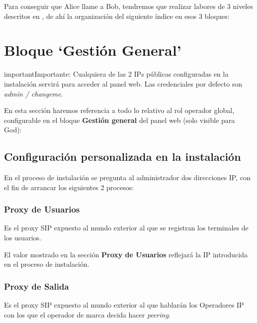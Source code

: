 \documentclass[letterpaper,10pt,spanish]{sphinxmanual}
\begin{document}
Para conseguir que Alice llame a Bob, tendremos que realizar labores de 3 niveles descritos en {\hyperref[operation_roles/index:operation\string-roles]{}}, de ahí la organización del siguiente índice en esos 3 bloques:


\section{Bloque `Gestión General'}
\label{internal_calls/god_portal::doc}\label{internal_calls/god_portal:bloque-gestion-general}
\begin{notice}{important}{Importante:}
Cualquiera de las 2 IPs públicas configuradas en la instalación servirá para acceder al panel web. Las credenciales por defecto son \emph{admin / changeme}.
\end{notice}

En esta sección haremos referencia a todo lo relativo al rol operador global, configurable en el bloque \textbf{Gestión general} del panel web (solo visible para God):



\subsection{Configuración personalizada en la instalación}
\label{internal_calls/god_portal:configuracion-personalizada-en-la-instalacion}
En el proceso de instalación se pregunta al administrador dos direcciones IP, con el fin de arrancar los siguientes 2 procesos:


\subsubsection{Proxy de Usuarios}
\label{internal_calls/god_portal:proxyusers}\label{internal_calls/god_portal:proxy-de-usuarios}
Es el proxy SIP expuesto al mundo exterior al que se registran los terminales de los usuarios.

El valor mostrado en la sección \textbf{Proxy de Usuarios} reflejará la IP introducida en el proceso de instalación.

\noindent{}


\subsubsection{Proxy de Salida}
\label{internal_calls/god_portal:proxy-de-salida}
Es el proxy SIP expuesto al mundo exterior al que hablarán los Operadores IP con los que el operador de marca decida hacer \emph{peering}.
\end{document}
